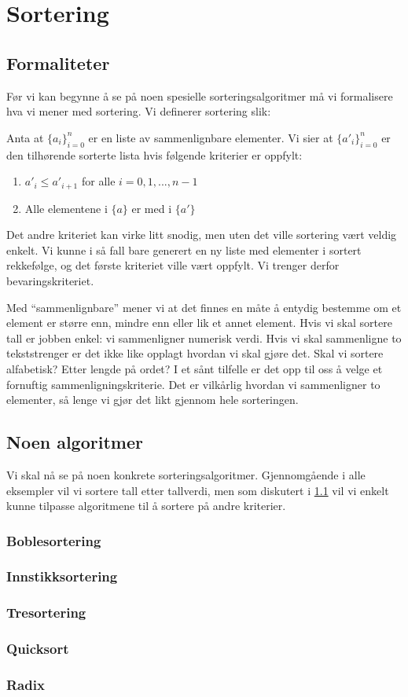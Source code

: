 \section{\color{red}Sortering}
\subsection{Formaliteter}
\label{sort_form}
Før vi kan begynne å se på noen spesielle sorteringsalgoritmer må vi formalisere hva vi mener med sortering. Vi definerer sortering slik:

\begin{definisjon}
Anta at $ \{a_i\}_{i=0}^n $ er en liste av sammenlignbare elementer. Vi sier at $ \{a'_i\}_{i=0}^n $ er den tilhørende sorterte lista hvis følgende kriterier er oppfylt:
\begin{enumerate}[i]
\item $ a'_i \leq a'_{i+1} $ for alle $ i = 0, 1, ..., n-1 $
\item Alle elementene i $ \{a\} $ er med i $ \{a'\} $
\end{enumerate}
\end{definisjon}

Det andre kriteriet kan virke litt snodig, men uten det ville sortering vært veldig enkelt. Vi kunne i så fall bare generert en ny liste med elementer i sortert rekkefølge, og det første kriteriet ville vært oppfylt. Vi trenger derfor bevaringskriteriet. 

Med ``sammenlignbare'' mener vi at det finnes en måte å entydig bestemme om et element er større enn, mindre enn eller lik et annet element. Hvis vi skal sortere tall er jobben enkel: vi sammenligner numerisk verdi. Hvis vi skal sammenligne to tekststrenger er det ikke like opplagt hvordan vi skal gjøre det. Skal vi sortere alfabetisk? Etter lengde på ordet? I et sånt tilfelle er det opp til oss å velge et fornuftig sammenligningskriterie. Det er vilkårlig hvordan vi sammenligner to elementer, så lenge vi gjør det likt gjennom hele sorteringen. 


\subsection{\color{red}Noen algoritmer}
Vi skal nå se på noen konkrete sorteringsalgoritmer. Gjennomgående i alle eksempler vil vi sortere tall etter tallverdi, men som diskutert i \ref{sort_form} vil vi enkelt kunne tilpasse algoritmene til å sortere på andre kriterier. 


\subsubsection{\color{red}Boblesortering}
\subsubsection{\color{red}Innstikksortering}
\subsubsection{\color{red}Tresortering}
\subsubsection{\color{red}Quicksort}
\label{quick}
\subsubsection{\color{red}Radix}